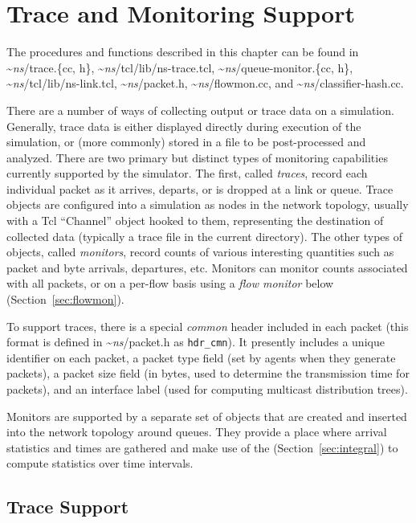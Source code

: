 \chapter{Trace and Monitoring Support}
\label{chap:trace}

The procedures and functions described in this chapter can be found in
\textasciitilde\emph{ns}/{trace.\{cc, h\}},
\textasciitilde\emph{ns}/{tcl/lib/ns-trace.tcl},
\textasciitilde\emph{ns}/{queue-monitor.\{cc, h\}},
\textasciitilde\emph{ns}/{tcl/lib/ns-link.tcl},
\textasciitilde\emph{ns}/{packet.h},
\textasciitilde\emph{ns}/{flowmon.cc}, and
\textasciitilde\emph{ns}/{classifier-hash.cc}.

There are a number of ways of collecting output or
trace data on a simulation.
Generally, trace data is either displayed directly during execution
of the simulation, or (more commonly) stored in a file to be
post-processed and analyzed.
There are two primary but distinct types of monitoring capabilities
currently supported by the simulator.
The first, called {\em traces}, record each individual packet
as it arrives, departs, or is dropped at a link or queue.
Trace objects are configured into a simulation as nodes in the
network topology, usually with a Tcl ``Channel'' object
hooked to them, representing the destination of collected data
(typically a trace file in the current directory).
The other types of objects, called {\em monitors}, record counts
of various interesting quantities such as packet and byte arrivals,
departures, etc.
Monitors can monitor counts associated with all packets,
or on a per-flow basis using a 
{\em flow monitor} below (Section~\ref{sec:flowmon}).

To support traces, there is a special {\em common} header
included in each packet (this format is defined in \textasciitilde\emph{ns}/{packet.h}
as {\tt hdr\_cmn}).
It presently includes a unique identifier on each packet, a
packet type field (set by agents when they generate packets),
a packet size field (in bytes, used to determine the transmission
time for packets), and an interface label (used for computing
multicast distribution trees).

Monitors are supported by a separate
set of objects that are created and inserted into the network topology
around queues.
They provide a place where
arrival statistics and times are gathered and make use of the
 (Section~\ref{sec:integral})
to compute statistics over time intervals.

\section{Trace Support}
\label{sec:otcltrace}


